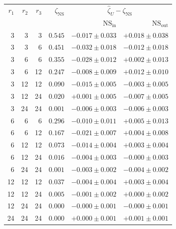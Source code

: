 \begin{tabular}{rrrrrr}
\toprule
$r_1$ & $r_2$ & $r_3$ & $\zeta_{\mathrm{NS}}$ & \multicolumn{2}{c}{$\hat\zeta_U - \zeta_{\mathrm{NS}}$} \\
& & & & $\mathrm{NS}_{\mathrm{in}}$ & $\mathrm{NS}_{\mathrm{out}}$ \\
\midrule
3 & 3 & 3 & $0.545$ & $-0.017 \pm 0.033$ & $+0.018 \pm 0.038$ \\
3 & 3 & 6 & $0.451$ & $-0.032 \pm 0.018$ & $-0.012 \pm 0.018$ \\
3 & 6 & 6 & $0.355$ & $-0.028 \pm 0.012$ & $+0.002 \pm 0.013$ \\
3 & 6 & 12 & $0.247$ & $-0.008 \pm 0.009$ & $+0.012 \pm 0.010$ \\
3 & 12 & 12 & $0.090$ & $-0.015 \pm 0.005$ & $-0.003 \pm 0.005$ \\
3 & 12 & 24 & $0.020$ & $+0.001 \pm 0.005$ & $-0.007 \pm 0.005$ \\
3 & 24 & 24 & $0.001$ & $-0.006 \pm 0.003$ & $-0.006 \pm 0.003$ \\
6 & 6 & 6 & $0.296$ & $-0.010 \pm 0.011$ & $+0.005 \pm 0.013$ \\
6 & 6 & 12 & $0.167$ & $-0.021 \pm 0.007$ & $+0.004 \pm 0.008$ \\
6 & 12 & 12 & $0.073$ & $-0.014 \pm 0.004$ & $+0.003 \pm 0.004$ \\
6 & 12 & 24 & $0.016$ & $-0.004 \pm 0.003$ & $-0.000 \pm 0.003$ \\
6 & 24 & 24 & $0.001$ & $-0.003 \pm 0.002$ & $-0.004 \pm 0.002$ \\
12 & 12 & 12 & $0.037$ & $-0.004 \pm 0.004$ & $+0.003 \pm 0.004$ \\
12 & 12 & 24 & $0.005$ & $-0.001 \pm 0.002$ & $+0.000 \pm 0.002$ \\
12 & 24 & 24 & $0.000$ & $-0.000 \pm 0.001$ & $-0.000 \pm 0.001$ \\
24 & 24 & 24 & $0.000$ & $+0.000 \pm 0.001$ & $+0.001 \pm 0.001$ \\
\bottomrule
\end{tabular}
